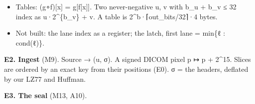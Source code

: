 \begin{itemize}
\begin{itemize}
\item key = P(δ), δ the impulse. For linear shift-invariant P, P(x) = key ∗ x.
\item w·x = Σ over the set bits b of w of x ≪ b.
\item With lanes wide enough that none carries, A·K holds the smoothed lanes, and K = K\_\allowbreak{}z·K\_\allowbreak{}y·K\_\allowbreak{}x.
\item A lane below 2\textasciicircum{}m under a row of sum S stays below 2\textasciicircum{}\{m + bitlen(S − 1)\}.
\item The CRC-64 key: the advance over 2\textasciicircum{}k zero bytes is A\textasciicircum{}\{2\textasciicircum{}k\}, 48 matrices (24,576 bytes), and crc(a ⊕ b) = crc(a) ⊕ crc(b) ⊕ crc(0).
\item The mirror fold repeats with period 2N: one period is laid as a table of offsets.
\end{itemize}
\item Tables: (g∘f)[x] = g[f[x]]. Two never-negative u, v with b\_\allowbreak{}u + b\_\allowbreak{}v ≤ 32 index as u·2\textasciicircum{}\{b\_\allowbreak{}v\} + v. A table is 2\textasciicircum{}b·⌈out\_\allowbreak{}bits/32⌉·4 bytes.
\item Not built: the lane index as a register; the latch, first lane = min\{ℓ : cond(ℓ)\}.
\end{itemize}

\textbf{E2. Ingest} (M9). Source → (u, σ). A signed DICOM pixel p ↦ p + 2\textasciicircum{}15. Slices are ordered by an exact key from their positions (E0). σ = the headers, deflated by our LZ77 and Huffman.

\textbf{E3. The seal} (M13, A10).

